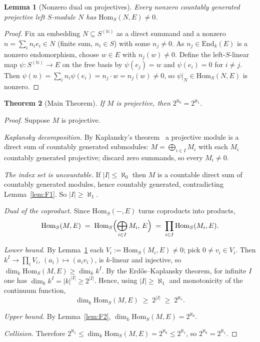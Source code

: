\documentclass[11pt,reqno]{amsart}
\theoremstyle{plain}
\newtheorem{theorem}{Theorem}[section]
\newtheorem{lemma}[theorem]{Lemma}
\theoremstyle{definition}
\theoremstyle{remark}
\newcommand{\End}{\mathrm{End}}
\newcommand{\Hom}{\mathrm{Hom}}
\newcommand{\N}{\mathbb{N}}
\begin{document}
\begin{lemma}[Nonzero dual on projectives]\label{lem:dual-nonzero}
Every nonzero countably generated projective left $S$-module $N$ has $\Hom_S(N,E)\ne 0$.
\end{lemma}

\begin{proof}
Fix an embedding $N\subseteq S^{(\N)}$ as a direct summand and a nonzero $n=\sum_i n_ie_i\in N$ (finite sum, $n_i\in S$) with some $n_j\ne 0$. As $n_j\in\End_k(E)$ is a nonzero endomorphism, choose $w\in E$ with $n_j(w)\ne 0$. Define the left-$S$-linear map $\psi\colon S^{(\N)}\to E$ on the free basis by $\psi(e_j)=w$ and $\psi(e_i)=0$ for $i\ne j$. Then $\psi(n)=\sum_i n_i\psi(e_i)=n_j\cdot w=n_j(w)\ne 0$, so $\psi|_N\in\Hom_S(N,E)$ is nonzero.
\end{proof}

\begin{theorem}[Main Theorem]\label{thm:main}
If $M$ is projective, then $2^{\aleph_0}=2^{\aleph_1}$.
\end{theorem}

\begin{proof}
Suppose $M$ is projective.

\emph{Kaplansky decomposition.} By Kaplansky's theorem~\cite{kaplansky} a projective module is a direct sum of countably generated submodules: $M=\bigoplus_{i\in I}M_i$ with each $M_i$ countably generated projective; discard zero summands, so every $M_i\ne 0$.

\emph{The index set is uncountable.} If $|I|\le\aleph_0$ then $M$ is a countable direct sum of countably generated modules, hence countably generated, contradicting Lemma~\ref{lem:F1}. So $|I|\ge\aleph_1$.

\emph{Dual of the coproduct.} Since $\Hom_S(-,E)$ turns coproducts into products,
\[
  \Hom_S(M,E)\;=\;\Hom_S\Bigl(\bigoplus_{i\in I}M_i,\,E\Bigr)\;=\;\prod_{i\in I}\Hom_S(M_i,E).
\]

\emph{Lower bound.} By Lemma~\ref{lem:dual-nonzero} each $V_i:=\Hom_S(M_i,E)\ne 0$; pick $0\ne v_i\in V_i$. Then $k^I\to\prod_i V_i$, $(a_i)\mapsto(a_iv_i)$, is $k$-linear and injective, so $\dim_k\Hom_S(M,E)\ge\dim_k k^I$. By the Erd\H{o}s--Kaplansky theorem, for infinite $I$ one has $\dim_k k^I=|k|^{|I|}\ge 2^{|I|}$. Hence, using $|I|\ge\aleph_1$ and monotonicity of the continuum function,
\[
  \dim_k\Hom_S(M,E)\;\ge\;2^{|I|}\;\ge\;2^{\aleph_1}.
\]

\emph{Upper bound.} By Lemma~\ref{lem:F2}, $\dim_k\Hom_S(M,E)=2^{\aleph_0}$.

\emph{Collision.} Therefore $2^{\aleph_1}\le\dim_k\Hom_S(M,E)=2^{\aleph_0}\le 2^{\aleph_1}$, so $2^{\aleph_0}=2^{\aleph_1}$.
\end{proof}
\end{document}
